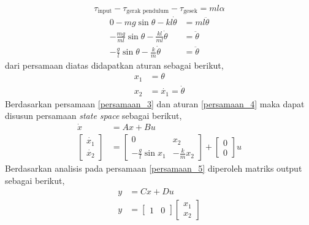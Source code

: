 \documentclass[../cover.tex]{subfiles}
\begin{document}
            \begin{equation}
                \tau_{\text{input}} - \tau_{\text{gerak pendulum}} - \tau_{\text{gesek}} =  ml\alpha
                \label{persamaan_2}
            \end{equation}
            \begin{equation}
                \begin{split}
                    0 - mg\sin{\theta} - kl\dot{\theta} &= ml\ddot{\theta} \\[5pt]
                    -\frac{mg}{ml}\sin{\theta} - \frac{kl}{ml}\dot{\theta} &= \ddot{\theta} \\[5pt]
                    -\frac{g}{l}\sin{\theta} - \frac{k}{m}\dot{\theta} &= \ddot{\theta}
                    \label{persamaan_3}
                \end{split}
            \end{equation}
            dari persamaan diatas didapatkan aturan sebagai berikut,
            \begin{equation}
                \begin{split}
                    x_1 &= \theta \\[5pt]
                    x_2 &= \dot{x_1} = \dot{\theta}
                    \label{persamaan_4}
                \end{split}
            \end{equation}
            Berdasarkan persamaan \eqref{persamaan_3} dan aturan \eqref{persamaan_4} maka dapat disusun persamaan \textit{state space} sebagai berikut,
            \begin{equation}
                \begin{split}
                    \dot{x} &= Ax+Bu \\[5pt]
                    \begin{bmatrix} \dot{x_1} \\ \dot{x_2} \end{bmatrix} &= \begin{bmatrix} 0 & x_2 \\ -\frac{g}{l}\sin{x_1} & -\frac{k}{m}x_2 \end{bmatrix} + \begin{bmatrix} 0 \\ 0 \end{bmatrix} u
                    \label{persamaan_5}
                \end{split}
            \end{equation}
            Berdasarkan analisis pada persamaan \eqref{persamaan_5} diperoleh matriks output sebagai berikut,
            \begin{equation}
                \begin{split}
                    y &= Cx + Du \\[5pt]
                    y &= \begin{bmatrix} 1 & 0 \end{bmatrix} \begin{bmatrix} x_1 \\ x_2 \end{bmatrix}
                    \label{persamaan_6}
                \end{split}
            \end{equation}
\end{document}
